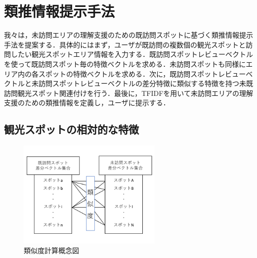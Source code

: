 \documentclass{deimj}
\begin{document}
\section{類推情報提示手法}
\label{sec:Analogical Information Presentation Method}
我々は，未訪問エリアの理解支援のための既訪問スポットに基づく類推情報提示手法を提案する．具体的にはまず，ユーザが既訪問の複数個の観光スポットと訪問したい観光スポットエリア情報を入力する．既訪問スポットレビューベクトルを使って既訪問スポット毎の特徴ベクトルを求める．未訪問スポットも同様にエリア内の各スポットの特徴ベクトルを求める．次に，既訪問スポットレビューベクトルと未訪問スポットレビューベクトルの差分特徴に類似する特徴を持つ未既訪問観光スポット関連付けを行う．最後に，TFIDFを用いて未訪問エリアの理解支援のための類推情報を定義し，ユーザに提示する．

\subsection{観光スポットの相対的な特徴}
\label{subsec:Relative features of tourist spots}

\begin{figure}[t]
  \begin{center}
    \includegraphics[clip,width=7.0cm]{picture/Photo_CosSim.png}
    \caption{類似度計算概念図}
    \label{fig:photo_cossim}
    \end{center}
\end{figure}
\end{document}

